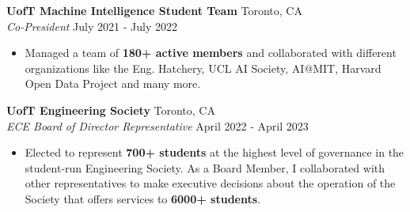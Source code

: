 \documentclass[a4paper]{article}
\begin{document}
\textbf{UofT Machine Intelligence Student Team} \hfill Toronto, CA\\
\textit{Co-President} \hfill July 2021 - July 2022\\
\vspace{-3mm}
\begin{itemize} \itemsep 0.5pt
	\item Managed a team of \textbf{180+ active members} and collaborated with different organizations like the Eng. Hatchery, UCL AI Society, AI@MIT, Harvard Open Data Project and many more.
\end{itemize}

\textbf{UofT Engineering Society} \hfill Toronto, CA\\
\textit{ECE Board of Director Representative} \hfill April 2022 - April 2023\\
\vspace{-3pt}
\begin{itemize}
	\item Elected to represent \textbf{700+ students} at the highest level of governance in the student-run Engineering Society. As a Board Member, I collaborated with other representatives to make executive decisions about the operation of the Society that offers services to \textbf{6000+ students}.
\end{itemize}
\end{document}
